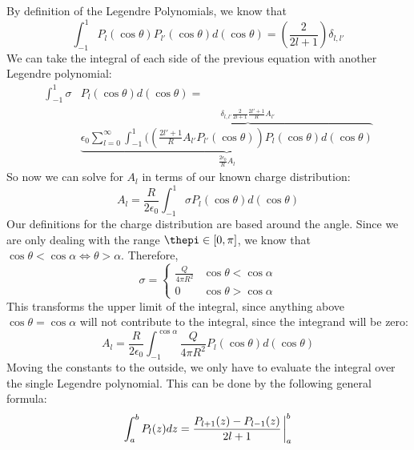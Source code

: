 \documentclass[a4paper,twoside]{article}
\begin{document}
\begin{itemize}
\begin{tcolorbox}[breakable]
    By definition of the Legendre Polynomials, we know that
    \begin{equation}
        \int_{-1}^{1} P_l(\cos\theta)P_{l'}(\cos\theta)d(\cos\theta) = \left( \frac{2}{2l+1} \right)\delta_{l,l'}
    \end{equation}
    We can take the integral of each side of the previous equation with another Legendre polynomial:
    \begin{equation}
        \begin{split}
            \int_{-1}^{1}\sigma &P_l(\cos\theta)d(\cos\theta) =\\
            &\underbrace{\epsilon_0\sum_{l=0}^{\infty}\overbrace{\int_{-1}^{1}(\left( \frac{2l'+1}{R}A_{l'}P_{l'}(\cos\theta)\right)P_{l}(\cos\theta)d(\cos\theta)}^{\delta_{l,l'} \frac{2}{2l+1}\frac{2l'+1}{R}A_{l'}}}_{\frac{2\epsilon_0}{R}A_l}
        \end{split}
    \end{equation}
    So now we can solve for $A_l$ in terms of our known charge distribution:
    \begin{equation}
        A_l = \frac{R}{2\epsilon_0}\int_{-1}^{1}\sigma P_l(\cos\theta)d(\cos\theta)
    \end{equation}
    Our definitions for the charge distribution are based around the angle. Since we are only dealing with the range $\thepi\in[0,\pi]$, we know that $\cos\theta < \cos\alpha\iff\theta > \alpha$. Therefore,
    \begin{equation}
        \sigma = \begin{cases}
            \frac{Q}{4\pi R^2} & \cos\theta < \cos\alpha\\
            0 & \cos\theta > \cos\alpha
        \end{cases}
    \end{equation}
    This transforms the upper limit of the integral, since anything above $\cos\theta = \cos\alpha$ will not contribute to the integral, since the integrand will be zero:
    \begin{equation}
        A_l = \frac{R}{2\epsilon_0}\int_{-1}^{\cos\alpha} \frac{Q}{4\pi R^2}P_l(\cos\theta)d(\cos\theta)
    \end{equation}
    Moving the constants to the outside, we only have to evaluate the integral over the single Legendre polynomial. This can be done by the following general formula:
    \begin{equation}
        \int_{a}^{b} P_l(z)dz = \frac{P_{l+1}(z) - P_{l-1}(z)}{2l+1}\eval_{a}^{b}
    \end{equation}

\end{tcolorbox}
\end{itemize}
\end{document}
